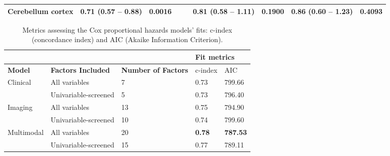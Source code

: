 \begin{sidewaystable}
{\begin{tabular}{|l|lr|lr|lr|lr|}
\hline
Cerebellum cortex & \textcolor[rgb]{0.2,0.2,0.2}{0.71 (0.57 -- 0.88)} & \textcolor[rgb]{0.2,0.2,0.2}{\textbf{0.0016}} & {\cellcolor[rgb]{0.753,0.753,0.753}} & {\cellcolor[rgb]{0.753,0.753,0.753}} & \textcolor[rgb]{0.2,0.2,0.2}{0.81 (0.58 -- 1.11)} & \textcolor[rgb]{0.2,0.2,0.2}{0.1900}\textcolor[rgb]{0.2,0.2,0.2}{} & \textcolor[rgb]{0.2,0.2,0.2}{0.86 (0.60 -- 1.23)} & \textcolor[rgb]{0.2,0.2,0.2}{0.4093} \\
\hline
\end{tabular}
}
\end{sidewaystable}



\begin{table}
\centering
\caption{Metrics assessing the Cox proportional hazards models' fits: c-index (concordance index) and AIC (Akaike Information Criterion).}
\label{tab:coxfitmetrics}
\begin{tabular}{|l|l|l|ll|} 
\cline{4-5}
\multicolumn{1}{l}{} & \multicolumn{1}{l}{} & & \multicolumn{2}{l|}{\textbf{Fit metrics} } \\ 
\hline
\textbf{Model} & \textbf{Factors Included} & \textbf{Number of Factors} & c-index & AIC \\ 
\hline
\multirow{2}{*}{Clinical} & All variables & 7 & 0.73 & 799.66 \\ 
\cline{2-5}
 & Univariable-screened & 5 & 0.73 & 796.40 \\ 
\hline
\multirow{2}{*}{Imaging} & All variables & 13 & 0.75 & 794.90 \\ 
\cline{2-5}
 & Univariable-screened & 10 & 0.74 & 799.60 \\ 
\hline
\multirow{2}{*}{Multimodal} & All variables & 20 & \textbf{0.78} & \textbf{787.53} \\ 
\cline{2-5}
 & Univariable-screened & 15 & 0.77 & 789.11 \\
\hline
\end{tabular}
\end{table}